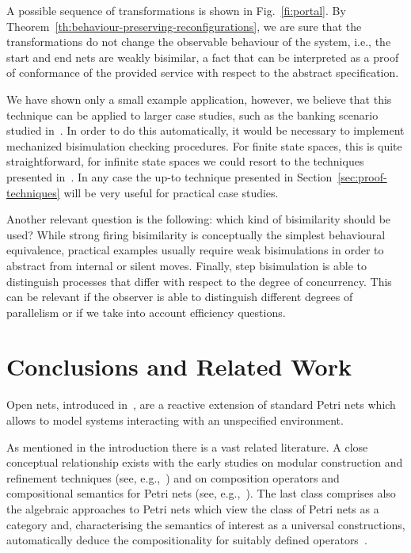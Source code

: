 \documentclass{LMCS}
\begin{document}
A possible sequence of transformations is shown in
Fig.~\ref{fi:portal}.
By Theorem~\ref{th:behaviour-preserving-reconfigurations}, we are sure
that the transformations do not change the observable behaviour
of the system, i.e., the start and end nets are weakly bisimilar, a
fact that can be interpreted as a proof of conformance of the provided
service with respect to the abstract specification.








We have shown only a small example application, however, we believe
that this technique can be applied to larger case studies, such as the
banking scenario studied in~\cite{bbcg:web-services-equ}. In order to do this
automatically, it would be necessary to implement mechanized
bisimulation checking procedures. For finite state spaces, this is
quite straightforward, for infinite state spaces we could resort to
the techniques presented in~\cite{h:proving-up-to}. In any case the
up-to technique presented in Section~\ref{sec:proof-techniques} will
be very useful for practical case studies.

Another relevant question is the following: which kind of 
bisimilarity should be used? While strong firing bisimilarity
is conceptually the simplest behavioural equivalence, practical examples
usually require weak bisimulations in order to abstract from internal
or silent
moves. Finally, step bisimulation is able to distinguish processes
that differ with respect to the degree of concurrency. This can be
relevant if the observer is able to distinguish different degrees of
parallelism or if we take into account efficiency questions.

\section{Conclusions and Related Work}
\label{se:conclusion}

Open nets, introduced in~\cite{BCEH:CMRS,BCEH:CSOP}, are
a reactive extension of standard Petri nets which allows to model
systems interacting with an unspecified environment. 

As mentioned in the introduction there is a vast related literature. A
close conceptual relationship exists with the early studies on modular
construction and refinement techniques (see,
e.g.,~\cite{v:petri-stepwise-refine,SM83,Mul85,Vog87}) and on
composition operators and compositional semantics for Petri
nets (see, e.g.,~\cite{And83,Ber87,Bau88,Vos87}).
The last class comprises also the algebraic approaches to Petri nets
which view the class of Petri nets as a category and, characterising
the semantics of interest as a universal constructions, automatically
deduce the compositionality for suitably defined
operators~\cite{Win:ES,Win:PNAM,MM:PNM}.
\end{document}
